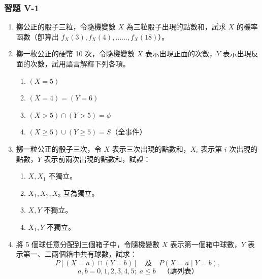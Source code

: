 \subsubsection*{習題 V-1}\label{sec:b5s-ex5-1}

\begin{enumerate}[label=\textbf{\arabic*.}]
  \item 擲公正的骰子三粒，令隨機變數 $X$ 為三粒骰子出現的點數和，試求 $X$ 的機率函數（卽算出 $f_X(3), f_X(4), \dots\dots, f_X(18)$）。

  \item 擲一枚公正的硬幣 10 次，令隨機變數 $X$ 表示出現正面的次數，$Y$ 表示出現反面的次數，試用語言解釋下列各項。
  \begin{enumerate}[(1)]
    \item $(X = 5)$
    \item $(X = 4) = (Y = 6)$
    \item $(X > 5) \cap (Y > 5) = \phi$
    \item $(X \ge 5) \cup (Y \ge 5) = S$（全事件）
  \end{enumerate}

  \item 擲一粒公正的骰子三次，令 $X$ 表示三次出現的點數和，$X_i$ 表示第 $i$ 次出現的點數，$Y$ 表示前兩次出現的點數和，試證：
  \begin{enumerate}[(1)]
    \item $X, X_1$ 不獨立。
    \item $X_1, X_2, X_3$ 互為獨立。
    \item $X, Y$ 不獨立。
    \item $X_1, Y$ 不獨立。
  \end{enumerate}

  \item 將 5 個球任意分配到三個箱子中，令隨機變數 $X$ 表示第一個箱中球數，$Y$ 表示第一、二兩個箱中共有球數，試求：
  \[
  P[(X = a) \cap (Y = b)] \quad \text{及} \quad P(X = a \mid Y = b),
  \]
  \[
  a, b = 0, 1, 2, 3, 4, 5; \; a \le b \quad \text{（請列表）}
  \]


\end{enumerate}
